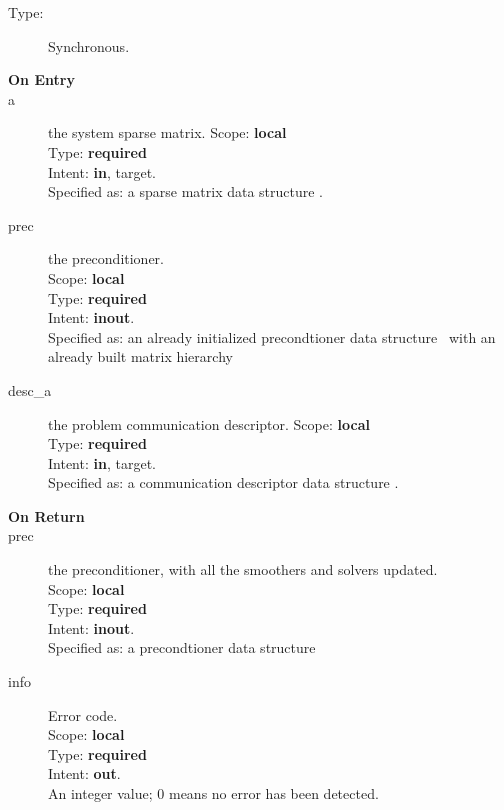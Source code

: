 

\begin{description}
\item[Type:] Synchronous.
\item[\bf On Entry]
\item[a] the system sparse matrix.
Scope: {\bf local} \\
Type: {\bf required}\\
Intent: {\bf in}, target.\\
Specified as: a sparse matrix data structure \spdata.
\item[prec] the preconditioner.\\
Scope: {\bf local} \\
Type: {\bf required}\\
Intent: {\bf inout}.\\
Specified as: an already initialized precondtioner data structure
\precdata\ with an already built matrix hierarchy \\
\item[desc\_a] the problem communication descriptor. 
Scope: {\bf local} \\
Type: {\bf required}\\
Intent: {\bf in}, target.\\
Specified as: a communication descriptor data structure \descdata.
\end{description}

\begin{description}
\item[\bf On Return]
\item[prec] the preconditioner, with all the smoothers and solvers  
  updated.\\
Scope: {\bf local} \\
Type: {\bf required}\\
Intent: {\bf inout}.\\
Specified as: a precondtioner data structure \precdata\\
\item[info] Error code.\\
Scope: {\bf local} \\
Type: {\bf required} \\
Intent: {\bf out}.\\
An integer value; 0 means no error has been detected. 
\end{description}




